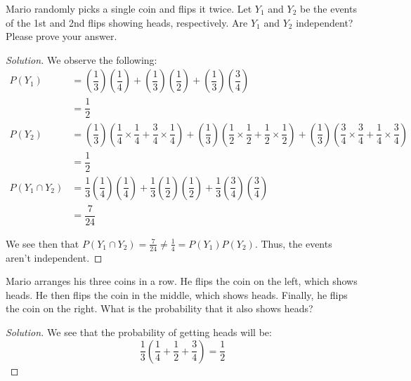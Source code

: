 \documentclass{article}
\newenvironment{solution}{\begin{proof}[Solution]}{\end{proof}}
\begin{document}
\begin{hw}
	Mario randomly picks a single coin and flips it twice. Let $Y_1$ and
	$Y_2$ be the events of the 1st and 2nd flips showing heads, respectively.
	Are $Y_1$ and $Y_2$ independent? Please prove your answer.
\end{hw}
\begin{solution}
	We observe the following:
	\begin{align*}
		P(Y_1) &= \left( \dfrac{1}{3} \right)\left( \dfrac{1}{4} \right) + \left( \dfrac{1}{3} \right)\left( \dfrac{1}{2} \right) + \left( \dfrac{1}{3} \right)\left( \dfrac{3}{4} \right) \\
		&= \dfrac{1}{2} \\
		P(Y_2) &= \left( \dfrac{1}{3} \right)\left( \dfrac{1}{4} \times \dfrac{1}{4} + \dfrac{3}{4} \times \dfrac{1}{4}\right) + \left( \dfrac{1}{3} \right)\left( \dfrac{1}{2} \times \dfrac{1}{2} + \dfrac{1}{2} \times \dfrac{1}{2}\right) + \left( \dfrac{1}{3} \right)\left( \dfrac{3}{4} \times \dfrac{3}{4} + \dfrac{1}{4} \times \dfrac{3}{4}\right)\\
		&= \dfrac{1}{2} \\
		P(Y_1 \cap Y_2) &= \dfrac{1}{3}\left( \dfrac{1}{4} \right)\left( \dfrac{1}{4} \right) + \dfrac{1}{3} \left( \dfrac{1}{2} \right)\left( \dfrac{1}{2} \right) + \dfrac{1}{3}\left( \dfrac{3}{4} \right)\left( \dfrac{3}{4} \right)\\
		&= \dfrac{7}{24}
	\end{align*}

	We see then that $P(Y_{1} \cap Y_{2}) = \frac{7}{24} \not= \frac{1}{4} = P(Y_{1})P(Y_{2})$. Thus, the events aren't independent.
\end{solution}

\begin{hw}
	Mario arranges his three coins in a row. He flips the coin on the 
	left, which shows heads. He then flips the coin in the middle, which shows 
	heads. Finally, he flips the coin on the right. What is the probability 
	that it also shows heads?
\end{hw}
\begin{solution}
	We see that the probability of getting heads will be:
	\begin{equation*}
		\dfrac{1}{3}\left( \dfrac{1}{4} + \dfrac{1}{2} + \dfrac{3}{4} \right) = \dfrac{1}{2}
	\end{equation*}
\end{solution}

\newpage
\end{document}
